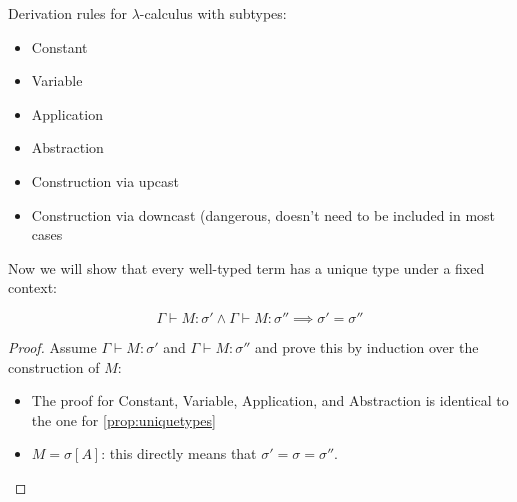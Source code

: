 \documentclass[main.tex]{subfiles}
\begin{document}
\begin{defn}
    \label{def:subtypederiv}
    Derivation rules for $\lambda$-calculus with subtypes:

    \begin{itemize}
        \item Constant
        \item Variable
        \item Application
        \item Abstraction
        \item Construction via upcast
        \item Construction via downcast (dangerous, doesn't need to be included in most cases            
    \end{itemize}
\end{defn}

Now we will show that every well-typed term has a unique type under a fixed context:
\begin{prop}
    \label{prop:uniquetypes}
    \[ \Gamma \vdash M : \sigma' \land \Gamma \vdash M : \sigma''
        \implies \sigma' = \sigma'' \]
\end{prop}
\begin{proof}
    Assume $\Gamma \vdash M : \sigma'$ and $\Gamma \vdash M : \sigma''$
    and prove this by induction over the construction of $M$:
    \begin{itemize}
        \item The proof for Constant, Variable, Application, and Abstraction is identical
            to the one for \cref{prop:uniquetypes}

        \item $M = \sigma[A]$: this directly means that $\sigma' = \sigma = \sigma''$.
    \end{itemize}
\end{proof}
\end{document}
